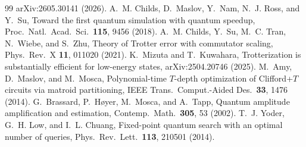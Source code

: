 \documentclass[aps,pra,twocolumn,superscriptaddress,nofootinbib]{revtex4-2}
\begin{document}
\begin{thebibliography}{99}
  arXiv:2605.30141 (2026).
 A.~M. Childs, D.~Maslov, Y.~Nam, N.~J. Ross, and Y.~Su, Toward the first quantum
  simulation with quantum speedup, Proc.\ Natl.\ Acad.\ Sci.\ \textbf{115}, 9456 (2018).
 A.~M. Childs, Y.~Su, M.~C. Tran, N.~Wiebe, and S.~Zhu, Theory of Trotter error with commutator
  scaling, Phys.\ Rev.\ X \textbf{11}, 011020 (2021).
 K.~Mizuta and T.~Kuwahara, Trotterization is substantially efficient for low-energy
  states, arXiv:2504.20746 (2025).
 M.~Amy, D.~Maslov, and M.~Mosca, Polynomial-time $T$-depth optimization of Clifford+$T$
  circuits via matroid partitioning, IEEE Trans.\ Comput.-Aided Des.\ \textbf{33}, 1476 (2014).
 G.~Brassard, P.~H{\o}yer, M.~Mosca, and A.~Tapp, Quantum amplitude amplification and
  estimation, Contemp.\ Math.\ \textbf{305}, 53 (2002).
 T.~J. Yoder, G.~H. Low, and I.~L. Chuang, Fixed-point quantum search with an optimal number
  of queries, Phys.\ Rev.\ Lett.\ \textbf{113}, 210501 (2014).
\end{thebibliography}
\end{document}
